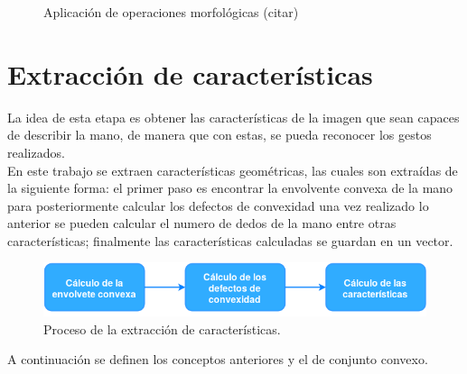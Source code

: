 \begin{figure}
\caption{Aplicación de operaciones morfológicas (citar)} \label{fig:OM}
\end{figure} 



\section{Extracción de características}\label{sec:Convexhull} 

La idea de esta etapa es obtener las características de la imagen que sean capaces de describir la mano, de manera que con estas, se pueda reconocer los gestos realizados.\\     
En este trabajo se extraen características geométricas, las cuales son extraídas de la siguiente forma: el primer paso es encontrar la envolvente convexa de la mano para posteriormente calcular los defectos de convexidad una vez realizado lo anterior se pueden calcular el numero de dedos de la mano entre otras características; finalmente las características calculadas  se guardan en un vector.  

\begin{figure}[h!]
\begin{center}
\includegraphics[scale=.7]{./Figures/DExtraccion.png}
\end{center}
\caption{Proceso de la extracción de características.}
\label{fig:DiagramaExtraccionCaracteristicas}
\end{figure} 

A continuación se definen los conceptos anteriores y el de conjunto convexo.

